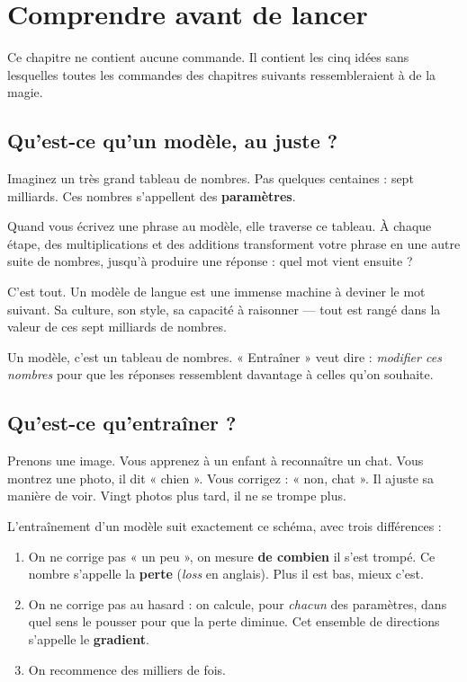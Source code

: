 \chapter{Comprendre avant de lancer}

Ce chapitre ne contient aucune commande. Il contient les cinq idées sans
lesquelles toutes les commandes des chapitres suivants ressembleraient à de la
magie.

\section{Qu'est-ce qu'un modèle, au juste ?}

Imaginez un très grand tableau de nombres. Pas quelques centaines : sept
milliards. Ces nombres s'appellent des \textbf{paramètres}.

Quand vous écrivez une phrase au modèle, elle traverse ce tableau. À chaque
étape, des multiplications et des additions transforment votre phrase en une
autre suite de nombres, jusqu'à produire une réponse : quel mot vient ensuite ?

C'est tout. Un modèle de langue est une immense machine à deviner le mot
suivant. Sa culture, son style, sa capacité à raisonner — tout est rangé dans la
valeur de ces sept milliards de nombres.

\begin{nkretenir}
Un modèle, c'est un tableau de nombres. « Entraîner » veut dire : \emph{modifier
ces nombres} pour que les réponses ressemblent davantage à celles qu'on
souhaite.
\end{nkretenir}

\section{Qu'est-ce qu'entraîner ?}

Prenons une image. Vous apprenez à un enfant à reconnaître un chat. Vous montrez
une photo, il dit « chien ». Vous corrigez : « non, chat ». Il ajuste sa manière
de voir. Vingt photos plus tard, il ne se trompe plus.

L'entraînement d'un modèle suit exactement ce schéma, avec trois différences :

\begin{enumerate}
  \item On ne corrige pas « un peu », on mesure \textbf{de combien} il s'est
        trompé. Ce nombre s'appelle la \textbf{perte} (\emph{loss} en anglais).
        Plus il est bas, mieux c'est.
  \item On ne corrige pas au hasard : on calcule, pour \emph{chacun} des
        paramètres, dans quel sens le pousser pour que la perte diminue. Cet
        ensemble de directions s'appelle le \textbf{gradient}.
  \item On recommence des milliers de fois.
\end{enumerate}

